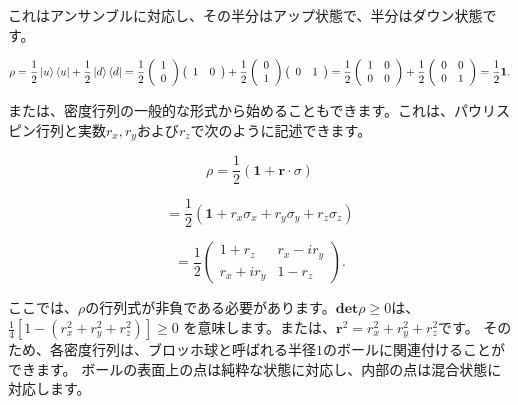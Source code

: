 これはアンサンブルに対応し、その半分はアップ状態で、半分はダウン状態です。

\begin{equation}
\label{250}
\rho  
= 
\frac{1}{2} \ket{u} \bra{u} +\frac{1}{2} \ket{d} \bra{d} 
=
\frac{1}{2}
\left( \begin{array}{c}
1  \\
0 
\end{array} \right)
\left( \begin{array}{cc}
1  & 0 
\end{array} \right)
+
\frac{1}{2}
\left( \begin{array}{c}
0  \\
1 
\end{array} \right)
\left( \begin{array}{cc}
0 & 1 
\end{array} \right)
=
\frac{1}{2}
\left( \begin{array}{cc}
1 & 0 \\
0 & 0
\end{array} \right)
+
\frac{1}{2}
\left( \begin{array}{cc}
0 & 0 \\
0 & 1
\end{array} \right)
=
\frac{1}{2} \mathbf{1}.
\end{equation}

または、密度行列の一般的な形式から始めることもできます。これは、パウリスピン行列と実数$r_x, r_y$および$r_z$で次のように記述できます。

\begin{equation}
\label{251}
\rho  
= 
\frac{1}{2} (\mathbf{1} + \mathbf{r} \cdot \sigma)
\end{equation}

\begin{equation}
\label{252}
= 
\frac{1}{2} (\mathbf{1} + r_x  \sigma_x + r_y  \sigma_y + r_z \sigma_z)
\end{equation}

\begin{equation}
\label{253}
= 
\frac{1}{2} 
\left( \begin{array}{cc}
1 + r_z & r_x -i r_y \\
r_x + i r_y & 1 - r_z
\end{array} \right).
\end{equation}

ここでは、$\rho$の行列式が非負である必要があります。$\mathbf{det} \rho \ge 0$は、
$\frac{1}{4} [  1-( r_x^2 + r_y^2 + r_z^2 ) ] \ge 0 $ を意味します。または、$ \mathbf{r}^2 =  r_x^2 + r_y^2 + r_z^2 $です。
そのため、各密度行列は、ブロッホ球と呼ばれる半径$1$のボールに関連付けることができます。
ボールの表面上の点は純粋な状態に対応し、内部の点は混合状態に対応します。

